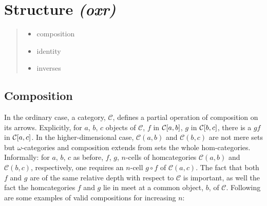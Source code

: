 
\section{Structure \textit{(oxr)}}
\label{sec:structure}

\begin{quote}
  \begin{itemize}
  \item composition

  \item identity

  \item inverses

  \end{itemize}
\end{quote}

\subsection{Composition}\label{sec:composition}
%
\newcommand{\cC}{\mathcal{C}}
%
In the ordinary case, a category, $\mathcal{C}$, defines a partial
operation of composition on its arrows. Explicitly, for $a$, $b$, $c$
objects of $\mathcal{C}$, $f$ in ${\mathcal{C}}[a,b]$, $g$  in
${\mathcal{C}}[b,c]$, there is a $gf$ in ${\mathcal{C}}[a,c]$.
%
In the higher-dimensional case, $\cC(a,b)$ and $\cC(b,c)$ are not mere
sets but $\omega$-categories and composition extends from sets the
whole hom-categories. Informally: for $a$, $b$, $c$ as before, $f$,
$g$, $n$-cells of homcategories $\cC(a,b)$ and $\cC(b,c)$,
respectively, one requires an $n$-cell $g\circ f$ of $\cC(a,c)$. The
fact that both $f$ and $g$ are of the same relative depth with respect
to $\cC$ is important, as well the fact the homcategories $f$ and $g$
lie in meet at a common object, $b$, of $\cC$. Following are some
examples of valid compositions for increasing $n$:
